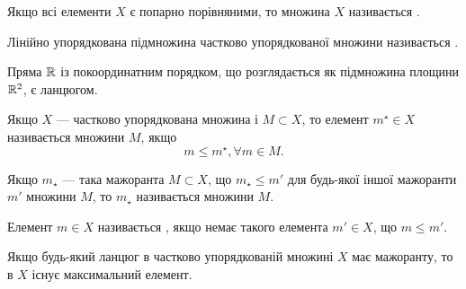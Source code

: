 \begin{definition}
Якщо всі елементи $X$ є попарно порівняними, то
множина $X$ називається .
\end{definition}

\begin{definition}
Лінійно упорядкована підмножина частково
упорядкованої множини називається .
\end{definition}

\begin{example}
Пряма $\mathbb{R}$ із покоординатним порядком, що
розглядається як підмножина площини $\mathbb{R}^2$, є ланцюгом.
\end{example}

\begin{definition}
Якщо $X$ --- частково упорядкована множина і
$M \subset X$, то елемент $m^\star \in X$ називається 
множини $M$, якщо
\begin{equation*}
    m \le m^\star, \forall m \in M.
\end{equation*}
\end{definition}

\begin{definition}
Якщо $m_\star$ --- така мажоранта $M \subset X$, що $m_\star \le m'$
для будь-якої іншої мажоранти $m'$ множини $M$, то $m_\star$
називається  множини $M$.
\end{definition}

\begin{definition}
Елемент $m \in X$ називається ,
якщо немає такого елемента $m' \in X$, що $m \le m'$.
\end{definition}

\begin{lemma}[Цорна] Якщо будь-який ланцюг в частково
упорядкованій множині $X$ має мажоранту, то в $X$ існує
максимальний елемент.
\end{lemma}


